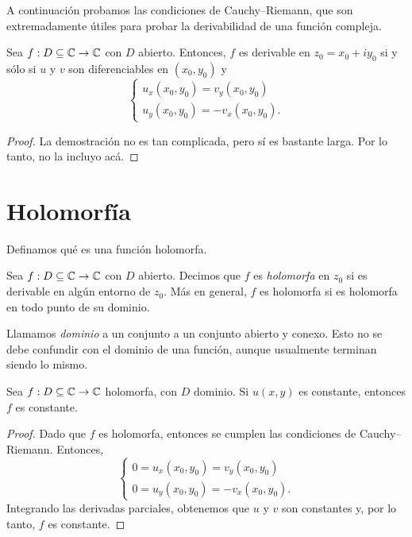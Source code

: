 A continuación probamos las condiciones de Cauchy--Riemann, que son extremadamente útiles para probar la derivabilidad de una función compleja.

\begin{proposition}
    Sea $f : D \subseteq \mathbb{C} \to \mathbb{C}$ con $D$ abierto. Entonces, $f$ es derivable en $z_0 = x_0 + i y_0$ si y sólo si $u$ y $v$ son diferenciables en $(x_0, y_0)$ y
    \begin{equation*}
        \begin{cases}
            u_x (x_0, y_0) = v_y(x_0, y_0) \\
            u_y (x_0, y_0) = -v_x(x_0, y_0).
        \end{cases}
    \end{equation*}
\end{proposition}

\begin{proof}
    La demostración no es tan complicada, pero sí es bastante larga. Por lo tanto, no la incluyo acá. 
\end{proof}


\section{Holomorfía}

Definamos qué es una función holomorfa.

\begin{definition}
    Sea $f : D \subseteq \mathbb{C} \to \mathbb{C}$ con $D$ abierto. Decimos que $f$ es \emph{holomorfa} en $z_0$ si es derivable en algún entorno de $z_0$. Más en general, $f$ es holomorfa si es holomorfa en todo punto de su dominio.
\end{definition}

Llamamos \textit{dominio} a un conjunto a un conjunto abierto y conexo. Esto no se debe confundir con el dominio de una función, aunque usualmente terminan siendo lo mismo.

\begin{proposition}
    Sea $f : D \subseteq \mathbb{C} \to \mathbb{C}$ holomorfa, con $D$ dominio. Si $u(x, y)$ es constante, entonces $f$ es constante.
\end{proposition}

\begin{proof}
    Dado que $f$ es holomorfa, entonces se cumplen las condiciones de Cauchy--Riemann. Entonces,
    \begin{equation*}
        \begin{cases}
            0 = u_x (x_0, y_0) = v_y(x_0, y_0) \\
            0 = u_y (x_0, y_0) = -v_x(x_0, y_0).
        \end{cases}
    \end{equation*}
    Integrando las derivadas parciales, obtenemos que $u$ y $v$ son constantes y, por lo tanto, $f$ es constante.
\end{proof}


